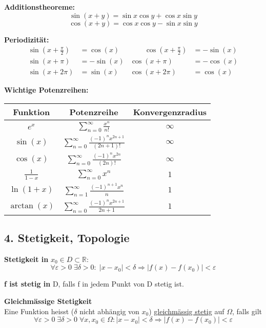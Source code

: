 \textbf{Additionstheoreme:}  
\[
\sin(x + y) = \sin x \cos y + \cos x \sin y
\]
\[
\cos(x + y) = \cos x \cos y - \sin x \sin y
\]

\textbf{Periodizität:}
\[
\begin{aligned}
\sin(x + \tfrac{\pi}{2}) &= \cos(x) & \qquad \cos(x + \tfrac{\pi}{2}) &= -\sin(x) \\
\sin(x + \pi) &= -\sin(x) & \cos(x + \pi) &= -\cos(x) \\
\sin(x + 2\pi) &= \sin(x) & \cos(x + 2\pi) &= \cos(x)
\end{aligned}
\]

\textbf{Wichtige Potenzreihen:}
\begin{tabular}{|c|c|c|}
\hline
Funktion & Potenzreihe & Konvergenzradius \\
\hline
\( e^x \) & \( \sum\limits_{n=0}^\infty \frac{x^n}{n!} \) & \( \infty \) \\
\hline
\( \sin(x) \) & \( \sum\limits_{n=0}^\infty \frac{(-1)^n x^{2n+1}}{(2n+1)!} \) & \( \infty \) \\
\hline
\( \cos(x) \) & \( \sum\limits_{n=0}^\infty \frac{(-1)^n x^{2n}}{(2n)!} \) & \( \infty \) \\
\hline
\( \frac{1}{1 - x} \) & \( \sum\limits_{n=0}^\infty x^n \) & \( 1 \) \\
\hline
\( \ln(1 + x) \) & \( \sum\limits_{n=1}^\infty \frac{(-1)^{n+1} x^n}{n} \) & \( 1 \) \\
\hline
\( \arctan(x) \) & \( \sum\limits_{n=0}^\infty \frac{(-1)^n x^{2n+1}}{2n+1} \) & \( 1 \) \\
\hline
\end{tabular}



\subsection{4. Stetigkeit, Topologie}
\textbf{Stetigkeit in } $x_0 \in D \subset \mathbb{R}$:  
\[
\forall \varepsilon > 0\; \exists \delta > 0:\; |x - x_0| < \delta \Rightarrow |f(x) - f(x_0)| < \varepsilon
\]

\textbf{f ist stetig in } D, falls f in jedem Punkt von D stetig ist.

\textbf{Gleichmässige Stetigkeit}\\
Eine Funktion heisst ($\delta$ nicht abhängig von $x_0$) \uline{gleichmässig stetig} auf $\Omega$, falls gilt
\[
\forall \varepsilon > 0 \; \exists \delta > 0 \; \forall x, x_0 \in \Omega : |x - x_0| < \delta \Rightarrow |f(x) - f(x_0)| < \varepsilon
\]

